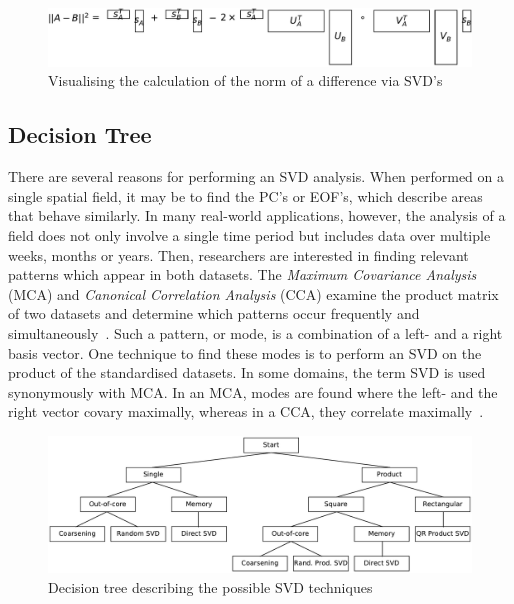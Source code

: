 \documentclass[ijgi,article,submit,moreauthors,pdftex,10pt,a4paper]{Definitions/mdpi}
\begin{document}
\begin{figure}[H]
\centering
\includegraphics[width=130mm]{Results/normDifferenceFromUSVs.pdf}
\caption[Exact norm of difference]{Visualising the calculation of the norm of a difference via SVD's}
\label{fig:normDifferenceFromUSVs}
\end{figure}

\subsection{Decision Tree}
\label{sec:Introduction/Decision Tree}

There are several reasons for performing an SVD analysis. When performed on a single spatial field, it may be to find the PC's or EOF's, which describe areas that behave similarly. In many real-world applications, however, the analysis of a field does not only involve a single time period but includes data over multiple weeks, months or years. Then, researchers are interested in finding relevant patterns which appear in both datasets. The \textit{Maximum Covariance Analysis} (MCA) and \textit{Canonical Correlation Analysis} (CCA) examine the product matrix of two datasets and determine which patterns occur frequently and simultaneously~\cite{Eshel2011, Storch1999}. Such a pattern, or mode, is a combination of a left- and a right basis vector. One technique to find these modes is to perform an SVD on the product of the standardised datasets. In some domains, the term SVD is used synonymously with MCA. In an MCA, modes are found where the left- and the right vector covary maximally, whereas in a CCA, they correlate maximally~\cite{Bretherton1992}.

\begin{figure}[H]
\centering
\includegraphics[width=\textwidth]{Results/FlowDiagram.pdf}
\caption{Decision tree describing the possible SVD techniques}
\label{fig:FlowDiagram}
\end{figure}
\end{document}

